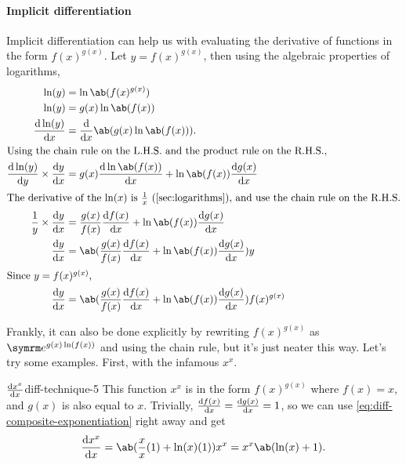 \paragraph{Implicit differentiation} Implicit differentiation can help us with evaluating the derivative of functions in the form $f(x)^{g(x)}$. Let $y = f(x)^{g(x)}$, then using the algebraic properties of logarithms,
\begin{align}
  \ln(y)                            & = \ln\ab(f(x)^{g(x)})                                                                                                 \\
  \ln(y)                            & = g(x)\ln\ab(f(x))                                                                                                    \\
  \odv{\ln(y)}{x}                   & = \odv*{\ab(g(x)\ln\ab(f(x)))}{x}.                                                                                    \\
  \intertext{Using the chain rule on the L.H.S. and the product rule on the R.H.S.,}
  \odv{\ln(y)}{y} \times \odv{y}{x} & = g(x)\odv{\ln\ab(f(x))}{x} + \ln\ab(f(x))\odv{g(x)}{x}                                                               \\
  \intertext{The derivative of the $\ln(x)$ is $\frac{1}{x}$ (\cref{sec:logarithms}), and use the chain rule on the R.H.S.}
  \frac{1}{y} \times \odv{y}{x}     & = \frac{g(x)}{f(x)}\odv{f(x)}{x} + \ln\ab(f(x))\odv{g(x)}{x}                                                          \\
  \odv{y}{x}                        & = \ab(\frac{g(x)}{f(x)}\odv{f(x)}{x} + \ln\ab(f(x))\odv{g(x)}{x})y                                                    \\
  \intertext{Since $y = f(x)^{g(x)}$,}
  \odv{y}{x}                        & = \ab(\frac{g(x)}{f(x)}\odv{f(x)}{x} + \ln\ab(f(x))\odv{g(x)}{x})f(x)^{g(x)} \label{eq:diff-composite-exponentiation}
\end{align}

Frankly, it can also be done explicitly by rewriting $f(x)^{g(x)}$ as $\e^{g(x)\ln(f(x))}$ and using the chain rule, but it's just neater this way. Let's try some examples. First, with the infamous $x^x$.
\begin{exmp}{$\odv{x^x}{x}$}{diff-technique-5}
  This function $x^x$ is in the form $f(x)^{g(x)}$ where $f(x) = x$, and $g(x)$ is also equal to $x$. Trivially, $\odv{f(x)}{x} = \odv{g(x)}{x} = 1$, so we can use \cref{eq:diff-composite-exponentiation} right away and get
  \begin{equation}
    \odv{x^x}{x} = \ab(\frac{x}{x}(1) + \ln(x)(1))x^x = x^x\ab(\ln(x) + 1).
  \end{equation}
\end{exmp}

